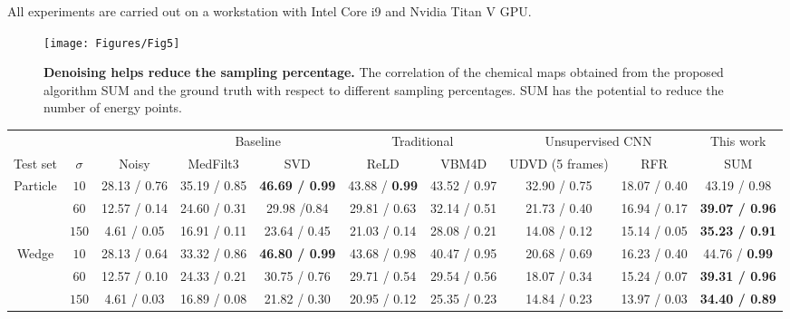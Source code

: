 \documentclass[10pt,twocolumn,letterpaper]{article}
\begin{document}
All experiments are carried out on a workstation with Intel Core i9 and Nvidia Titan V GPU. 
\begin{figure}
  \centering
    \texttt{[image: Figures/Fig5]}
    \vspace{-10pt}
    \caption{\textbf{Denoising helps reduce the sampling percentage.} The correlation of the chemical maps obtained from the proposed algorithm SUM and the ground truth with respect to different sampling percentages. SUM has the potential to reduce the number of energy points.}
    \vspace{-10pt}
    \label{fig5}
\end{figure} 

\begin{table*}[ht]
    \centering
    \footnotesize{
    \begin{tabular}{cccccccccc}
        \toprule

        \multicolumn{1}{l}{\phantom} &
        \multicolumn{1}{l}{\phantom} &
        \multicolumn{1}{l}{\phantom} &
        \multicolumn{2}{c}{Baseline}    &
        \multicolumn{2}{c}{Traditional}    &
        \multicolumn{2}{c}{Unsupervised CNN}  &
        \multicolumn{1}{c}{This work} \\ 
        \cmidrule(lr){4-5}
        \cmidrule(lr){6-7}
        \cmidrule(lr){8-9}
        \cmidrule(lr){10-10}
        
         \multicolumn{1}{c}{Test set} &
        \multicolumn{1}{c}{$\sigma$} &
        \multicolumn{1}{c}{Noisy} &
         \multicolumn{1}{c}{MedFilt3} &
         \multicolumn{1}{c}{SVD} &
        \multicolumn{1}{c}{ReLD} &
        \multicolumn{1}{c}{VBM4D}     &
        \multicolumn{1}{c}{UDVD (5 frames)} & 
         \multicolumn{1}{c}{RFR}     &
        \multicolumn{1}{c}{SUM}\\
        
        
        \midrule
        
        \multirow{3}{*}{Particle} 
        & $10$ & 28.13 / 0.76 & 35.19 / 0.85 &  \textbf{46.69 / 0.99} & 43.88 / \textbf{0.99}  & 43.52 / 0.97 &   32.90 / 0.75 & 18.07 / 0.40 & 43.19 / 0.98 \\
        & $60$ & 12.57 / 0.14 & 24.60 / 0.31 &  29.98 /0.84 & 29.81 / 0.63 & 32.14 / 0.51 & 21.73 / 0.40 & 16.94 / 0.17 & \textbf{39.07 / 0.96} \\
        & $150$ & 4.61 / 0.05 & 16.91 / 0.11 & 23.64 / 0.45 & 21.03 / 0.14 & 28.08 / 0.21 &  14.08 / 0.12 & 15.14 / 0.05 & \textbf{35.23 / 0.91} \\
        \midrule
        \multirow{3}{*}{Wedge} 
        & $10$ & 28.13 / 0.64 & 33.32 / 0.86 & \textbf{46.80 / 0.99}   & 43.68 / 0.98  & 40.47 / 0.95  & 20.68 / 0.69 &  16.23 / 0.40  & 44.76 / \textbf{0.99} \\
        & $60$ & 12.57 / 0.10 & 24.33 / 0.21 & 30.75 / 0.76  &  29.71 / 0.54  & 29.54 / 0.56  & 18.07 / 0.34 & 15.24 / 0.07 & \textbf{39.31 / 0.96} \\
        & $150$ & 4.61 / 0.03 & 16.89 / 0.08 & 21.82 / 0.30  &   20.95 / 0.12 & 25.35 / 0.23 & 14.84 / 0.23  & 13.97 / 0.03& \textbf{34.40 / 0.89} \\
    

\end{tabular}}
\end{table*}
\end{document}
